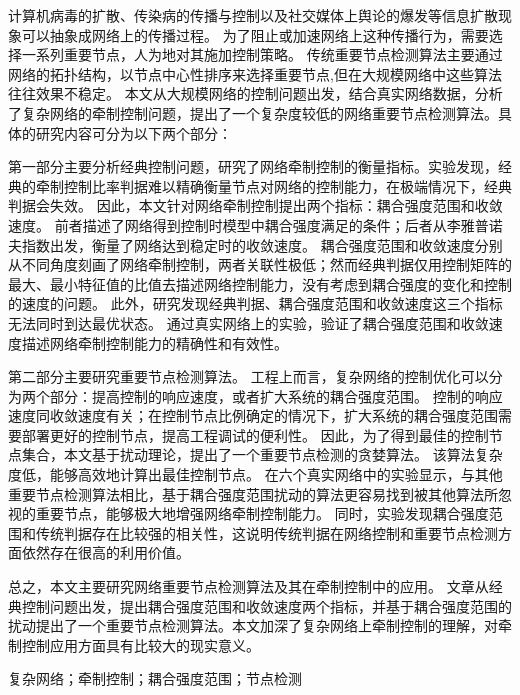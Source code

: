 \begin{abstractCN}
	
计算机病毒的扩散、传染病的传播与控制以及社交媒体上舆论的爆发等信息扩散现象可以抽象成网络上的传播过程。
为了阻止或加速网络上这种传播行为，需要选择一系列重要节点，人为地对其施加控制策略。
传统重要节点检测算法主要通过网络的拓扑结构，以节点中心性排序来选择重要节点,但在大规模网络中这些算法往往效果不稳定。
本文从大规模网络的控制问题出发，结合真实网络数据，分析了复杂网络的牵制控制问题，提出了一个复杂度较低的网络重要节点检测算法。具体的研究内容可分为以下两个部分：

第一部分主要分析经典控制问题，研究了网络牵制控制的衡量指标。实验发现，经典的牵制控制比率判据难以精确衡量节点对网络的控制能力，在极端情况下，经典判据会失效。
因此，本文针对网络牵制控制提出两个指标：耦合强度范围和收敛速度。
前者描述了网络得到控制时模型中耦合强度满足的条件；后者从李雅普诺夫指数出发，衡量了网络达到稳定时的收敛速度。
耦合强度范围和收敛速度分别从不同角度刻画了网络牵制控制，两者关联性极低；然而经典判据仅用控制矩阵的最大、最小特征值的比值去描述网络控制能力，没有考虑到耦合强度的变化和控制的速度的问题。
此外，研究发现经典判据、耦合强度范围和收敛速度这三个指标无法同时到达最优状态。
通过真实网络上的实验，验证了耦合强度范围和收敛速度描述网络牵制控制能力的精确性和有效性。

第二部分主要研究重要节点检测算法。
工程上而言，复杂网络的控制优化可以分为两个部分：提高控制的响应速度，或者扩大系统的耦合强度范围。
控制的响应速度同收敛速度有关；在控制节点比例确定的情况下，扩大系统的耦合强度范围需要部署更好的控制节点，提高工程调试的便利性。
因此，为了得到最佳的控制节点集合，本文基于扰动理论，提出了一个重要节点检测的贪婪算法。
该算法复杂度低，能够高效地计算出最佳控制节点。
在六个真实网络中的实验显示，与其他重要节点检测算法相比，基于耦合强度范围扰动的算法更容易找到被其他算法所忽视的重要节点，能够极大地增强网络牵制控制能力。
同时，实验发现耦合强度范围和传统判据存在比较强的相关性，这说明传统判据在网络控制和重要节点检测方面依然存在很高的利用价值。

总之，本文主要研究网络重要节点检测算法及其在牵制控制中的应用。
文章从经典控制问题出发，提出耦合强度范围和收敛速度两个指标，并基于耦合强度范围的扰动提出了一个重要节点检测算法。本文加深了复杂网络上牵制控制的理解，对牵制控制应用方面具有比较大的现实意义。

\end{abstractCN}

\begin{keywordCN}
复杂网络；牵制控制；耦合强度范围；节点检测
\end{keywordCN}

